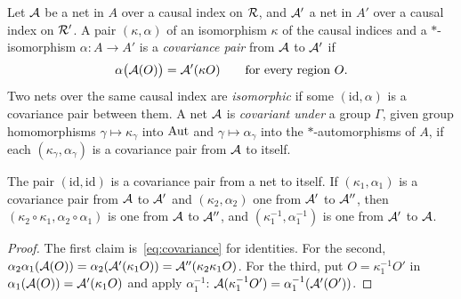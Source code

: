 \begin{definition}[Covariance]\label{def:covariance}
Let $\mathcal A$ be a net in $A$ over a causal index on $\mathcal R$, and $\mathcal A'$ a net in $A'$ over a causal
index on $\mathcal R'$. A pair $(\kappa,\alpha)$ of an isomorphism $\kappa$ of the causal indices and
a $*$-isomorphism $\alpha:A\to A'$ is a \emph{covariance pair} from $\mathcal A$ to $\mathcal A'$ if
\begin{equation}\label{eq:covariance}
\alpha\bigl(\mathcal A(O)\bigr)=\mathcal A'(\kappa O)\qquad\text{for every region }O.
\end{equation}
Two nets over the same causal index are \emph{isomorphic} if some $(\mathrm{id},\alpha)$ is a
covariance pair between them. A net $\mathcal A$ is \emph{covariant under} a group $\Gamma$, given
group homomorphisms $\gamma\mapsto\kappa_\gamma$ into $\operatorname{Aut}$ and $\gamma\mapsto\alpha_\gamma$
into the $*$-automorphisms of $A$, if each $(\kappa_\gamma,\alpha_\gamma)$ is a covariance
pair from $\mathcal A$ to itself.
\end{definition}

\begin{lemma}\label{lem:pairs}
The pair $(\mathrm{id},\mathrm{id})$ is a covariance pair from a net to itself. If
$(\kappa_1,\alpha_1)$ is a covariance pair from $\mathcal A$ to $\mathcal A'$ and $(\kappa_2,\alpha_2)$ one
from $\mathcal A'$ to $\mathcal A''$, then $(\kappa_2\circ\kappa_1,\alpha_2\circ\alpha_1)$ is one from $\mathcal A$
to $\mathcal A''$, and $(\kappa_1^{-1},\alpha_1^{-1})$ is one from $\mathcal A'$ to $\mathcal A$.
\end{lemma}
\begin{proof}
The first claim is~\eqref{eq:covariance} for identities. For the second,
$\alpha_2\alpha_1(\mathcal A(O))=\alpha_2(\mathcal A'(\kappa_1O))=\mathcal A''(\kappa_2\kappa_1O)$. For the third,
put $O=\kappa_1^{-1}O'$ in $\alpha_1(\mathcal A(O))=\mathcal A'(\kappa_1O)$ and apply $\alpha_1^{-1}$:
$\mathcal A(\kappa_1^{-1}O')=\alpha_1^{-1}(\mathcal A'(O'))$.
\end{proof}

\begin{remark}\label{rem:axiom5}
\end{remark}


